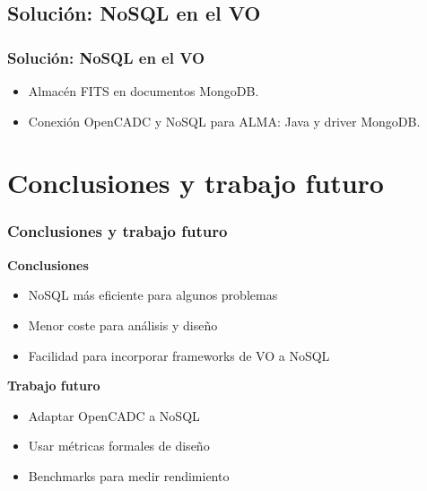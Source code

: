 \documentclass[serif,12pt]{beamer}
\begin{document}
\subsection{Solución: NoSQL en el VO}
\begin{frame}
\frametitle{Solución: NoSQL en el VO}

\begin{itemize}
\item Almacén FITS en documentos MongoDB.
\item Conexión OpenCADC y NoSQL para ALMA: Java y driver MongoDB.
\end{itemize}


\end{frame}


\section{Conclusiones y trabajo futuro}
\begin{frame}
\frametitle{Conclusiones y trabajo futuro}

\begin{multicols}{2}

\textbf{Conclusiones}
\begin{itemize}
\item NoSQL más eficiente para algunos problemas
\item Menor coste para análisis y diseño
\item Facilidad para incorporar frameworks de VO a NoSQL
\end{itemize}

\textbf{Trabajo futuro}
\begin{itemize}
\item Adaptar OpenCADC a NoSQL
\item Usar métricas formales de diseño
\item Benchmarks para medir rendimiento
\end{itemize}

\end{multicols}

\end{frame}
\end{document}
